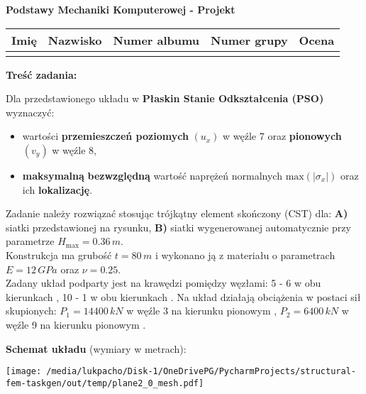 \documentclass[a4paper,10pt]{article}
\begin{document}
\begin{center}
    {\Large \textbf{Podstawy Mechaniki Komputerowej - Projekt}}
    \end{center}

    \begin{table}[ht]
        \centering
        \begin{tabular}{
            m{}m{}m{}m{}m{}}
        \toprule
        Imię & Nazwisko & Numer albumu & Numer grupy  & Ocena \\ \midrule
             &          &              &              &       \\ \bottomrule
        \end{tabular}
        \label{tab:dane_studenta}
    \end{table}

    \noindent\textbf{Treść zadania:} \vspace{1mm}

    \noindent Dla przedstawionego układu w \textbf{Płaskin Stanie Odkształcenia (PSO)} wyznaczyć:
    \begin{itemize}
        \item wartości \textbf{przemieszczeń poziomych} $(u_x)$ w węźle 7 oraz \textbf{pionowych} $(v_y)$ w węźle 8,
        \item \textbf{maksymalną} \textbf{bezwzględną} wartość naprężeń normalnych $\mathrm{max}(|\sigma_x|)$ oraz ich \textbf{lokalizację}.
    \end{itemize}

    \noindent Zadanie należy rozwiązać stosując trójkątny element skończony (CST) dla: \textbf{A)} siatki przedstawionej na rysunku, \textbf{B)} siatki wygenerowanej automatycznie przy parametrze $H_{\mathrm{max}} = 0.36$\,$\si{m}$. \\
    Konstrukcja ma grubość $t = 80$\,$\si{m}$ i wykonano ją z materiału o parametrach $E = 12$\,$\si{GPa}$ oraz $\nu = 0.25$. \\
    Zadany układ podparty jest na krawędzi pomiędzy węzłami:
        5 - 6 w obu kierunkach%
,         10 - 1 w obu kierunkach%
. 
    Na układ działają obciążenia w postaci 
 sił skupionych: 
        $P_1 = 14400\,\si{kN}$ w węźle 3 na kierunku pionowym%
,         $P_2 = 6400\,\si{kN}$ w węźle 9 na kierunku pionowym%
. \newline

    \noindent\textbf{Schemat układu} (wymiary w metrach):
    
    \texttt{[image: /media/lukpacho/Disk-1/OneDrivePG/PycharmProjects/structural-fem-taskgen/out/temp/plane2\_0\_mesh.pdf]}\par
\end{document}
